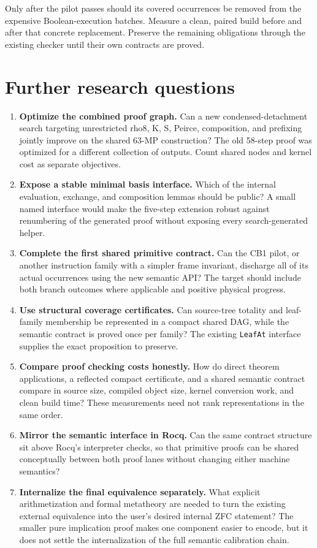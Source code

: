 \documentclass[11pt,letterpaper]{article}
\begin{document}
Only after the pilot passes should its covered occurrences be removed from the
expensive Boolean-execution batches. Measure a clean, paired build before and
after that concrete replacement. Preserve the remaining obligations through the
existing checker until their own contracts are proved.

\section{Further research questions}

\begin{enumerate}
\item \textbf{Optimize the combined proof graph.} Can a new condensed-detachment
search targeting unrestricted rho8, K, S, Peirce, composition, and prefixing
jointly improve on the shared 63-MP construction? The old 58-step proof was
optimized for a different collection of outputs. Count shared nodes and kernel
cost as separate objectives.
\item \textbf{Expose a stable minimal basis interface.} Which of the internal
evaluation, exchange, and composition lemmas should be public? A small named
interface would make the five-step extension robust against renumbering of the
generated proof without exposing every search-generated helper.
\item \textbf{Complete the first shared primitive contract.} Can the CB1 pilot,
or another instruction family with a simpler frame invariant, discharge all
of its actual occurrences using the new semantic API? The target should include
both branch outcomes where applicable and positive physical progress.
\item \textbf{Use structural coverage certificates.} Can source-tree totality
and leaf-family membership be represented in a compact shared DAG, while the
semantic contract is proved once per family? The existing \texttt{LeafAt}
interface supplies the exact proposition to preserve.
\item \textbf{Compare proof checking costs honestly.} How do direct theorem
applications, a reflected compact certificate, and a shared semantic contract
compare in source size, compiled object size, kernel conversion work, and clean
build time? These measurements need not rank representations in the same order.
\item \textbf{Mirror the semantic interface in Rocq.} Can the same contract
structure sit above Rocq's interpreter checks, so that primitive proofs can be
shared conceptually between both proof lanes without changing either machine
semantics?
\item \textbf{Internalize the final equivalence separately.} What explicit
arithmetization and formal metatheory are needed to turn the existing external
equivalence into the user's desired internal ZFC statement? The smaller pure
implication proof makes one component easier to encode, but it does not settle
the internalization of the full semantic calibration chain.
\end{enumerate}
\end{document}

